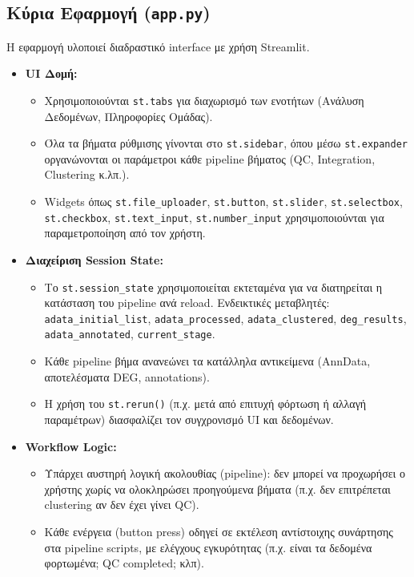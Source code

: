 \documentclass[12pt, a4paper]{article}
\begin{document}
\subsection{Κύρια Εφαρμογή (\texttt{app.py})}
Η εφαρμογή υλοποιεί διαδραστικό interface με χρήση Streamlit.
\begin{itemize}
    \item \textbf{UI Δομή:}
    \begin{itemize}
        \item Χρησιμοποιούνται \texttt{st.tabs} για διαχωρισμό των ενοτήτων (Ανάλυση Δεδομένων, Πληροφορίες Ομάδας).
        \item Όλα τα βήματα ρύθμισης γίνονται στο \texttt{st.sidebar}, όπου μέσω \texttt{st.expander} οργανώνονται οι παράμετροι κάθε pipeline βήματος (QC, Integration, Clustering κ.λπ.).
        \item Widgets όπως \texttt{st.file\_uploader}, \texttt{st.button}, \texttt{st.slider}, \texttt{st.selectbox}, \texttt{st.checkbox}, \texttt{st.text\_input}, \texttt{st.number\_input} χρησιμοποιούνται για παραμετροποίηση από τον χρήστη.
    \end{itemize}
    \item \textbf{Διαχείριση Session State:}
    \begin{itemize}
        \item Το \texttt{st.session\_state} χρησιμοποιείται εκτεταμένα για να διατηρείται η κατάσταση του pipeline ανά reload. Ενδεικτικές μεταβλητές: \texttt{adata\_initial\_list}, \texttt{adata\_processed}, \texttt{adata\_clustered}, \texttt{deg\_results}, \texttt{adata\_annotated}, \texttt{current\_stage}.
        \item Κάθε pipeline βήμα ανανεώνει τα κατάλληλα αντικείμενα (AnnData, αποτελέσματα DEG, annotations).
        \item Η χρήση του \texttt{st.rerun()} (π.χ. μετά από επιτυχή φόρτωση ή αλλαγή παραμέτρων) διασφαλίζει τον συγχρονισμό UI και δεδομένων.
    \end{itemize}
    \item \textbf{Workflow Logic:}
    \begin{itemize}
        \item Υπάρχει αυστηρή λογική ακολουθίας (pipeline): δεν μπορεί να προχωρήσει ο χρήστης χωρίς να ολοκληρώσει προηγούμενα βήματα (π.χ. δεν επιτρέπεται clustering αν δεν έχει γίνει QC).
        \item Κάθε ενέργεια (button press) οδηγεί σε εκτέλεση αντίστοιχης συνάρτησης στα pipeline scripts, με ελέγχους εγκυρότητας (π.χ. είναι τα δεδομένα φορτωμένα; QC completed; κλπ).

\end{itemize}
\end{itemize}
\end{document}

